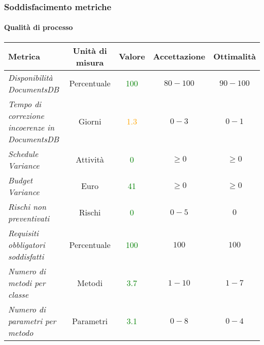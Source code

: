 \newpage
\subsubsection{Soddisfacimento metriche}

\paragraph{Qualità di processo}
\begin{longtable}{|>{\centering}m{5cm}|c|c|c|c|}
\hline
\textbf{Metrica} & \textbf{Unità di misura} & \textbf{Valore} & \textbf{Accettazione} & \textbf{Ottimalità}\\
\hline
\endhead
\emph{Disponibilità DocumentsDB} & {Percentuale} & \textcolor{Green}{100} & $80 - 100$ & $90 - 100$\\ \hline
\emph{Tempo di correzione incoerenze in DocumentsDB} & {Giorni} & \textcolor{Orange}{1.3} & $0 - 3$ & $0 - 1$\\ \hline
\emph{Schedule Variance} & {Attività} & \textcolor{Green}{0} & $\geq 0$  & $\geq 0$\\ \hline
\emph{Budget Variance} & {Euro} & \textcolor{Green}{41} & $\geq 0$ & $\geq 0$\\ \hline
\emph{Rischi non preventivati} & {Rischi} & \textcolor{Green}{0} & $0 - 5$ & $0$\\ \hline
\emph{Requisiti obbligatori soddisfatti} & {Percentuale} & \textcolor{Green}{100} & $100$ & $100$\\ \hline
\emph{Numero di metodi per classe} & {Metodi} & \textcolor{Green}{3.7} & $1 - 10$ & $1 - 7$\\ \hline
\emph{Numero di parametri per metodo} & {Parametri} & \textcolor{Green}{3.1} & $0 - 8$ & $0 - 4$\\ \hline

\end{longtable}
